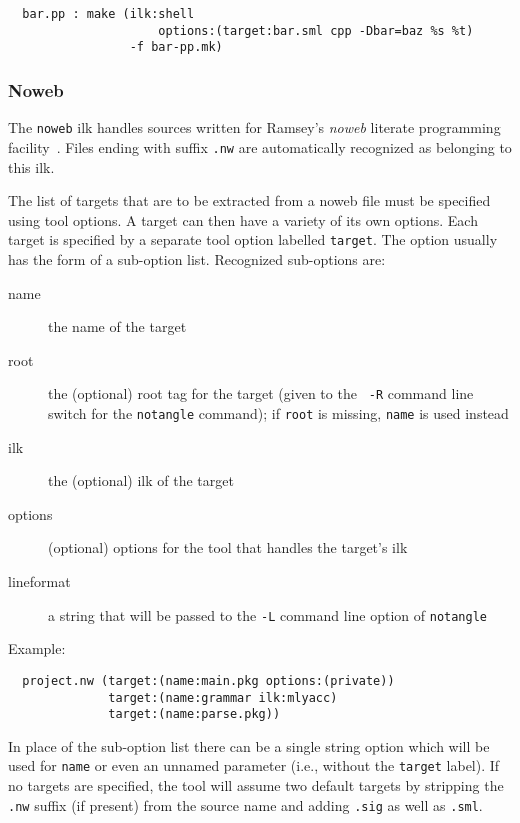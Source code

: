\begin{verbatim}
  bar.pp : make (ilk:shell
                     options:(target:bar.sml cpp -Dbar=baz %s %t)
                 -f bar-pp.mk)
\end{verbatim}

\subsubsection{Noweb}
\label{sec:builtin-tools:noweb}

The {\tt noweb} ilk handles sources written for Ramsey's {\it noweb}
literate programming facility~\cite{ramsey:simplified}.  Files ending
with suffix {\tt .nw} are automatically recognized as belonging to
this ilk.

The list of targets that are to be extracted from a noweb file must be
specified using tool options.  A target can then have a variety of its
own options.  Each target is specified by a separate tool option
labelled {\tt target}.  The option usually has the form of a
sub-option list.  Recognized sub-options are:

\begin{description}
\item[name] the name of the target
\item[root] the (optional) root tag for the target (given to the {\tt
-R} command line switch for the {\tt notangle} command); if {\tt root}
is missing, {\tt name} is used instead
\item[ilk] the (optional) ilk of the target
\item[options] (optional) options for the tool that handles the
target's ilk
\item[lineformat] a string that will be passed to the {\tt -L} command
line option of {\tt notangle}
\end{description}

Example:

\begin{verbatim}
  project.nw (target:(name:main.pkg options:(private))
              target:(name:grammar ilk:mlyacc)
              target:(name:parse.pkg))
\end{verbatim}

In place of the sub-option list there can be a single string option
which will be used for {\tt name} or even an unnamed parameter (i.e.,
without the {\tt target} label).  If no targets are specified, the
tool will assume two default targets by stripping the {\tt .nw}
suffix (if present) from the source name and adding {\tt .sig} as well
as {\tt .sml}.

